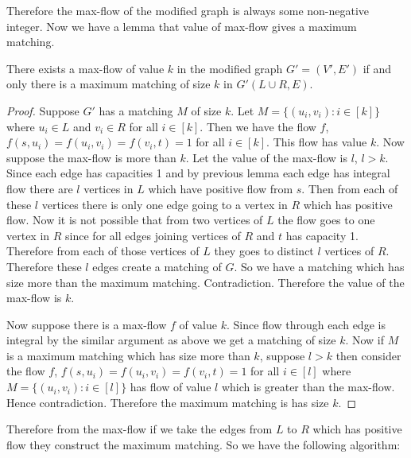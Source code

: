 Therefore the max-flow of the modified graph is always some non-negative integer. Now we have a lemma that value of max-flow gives a maximum matching.
\begin{lemma}{}{}
	There exists a max-flow of value $k$ in the modified graph $G'=(V',E')$ if and only there is a maximum matching of size $k$ in $G'(L\cup R, E)$. 
\end{lemma}
\begin{proof}
	Suppose $G'$ has a matching $M$ of size $k$. Let $M=\{(u_i,v_i)\colon i\in[k]\}$ where $u_i\in L$ and $v_i\in R$ for all $i\in[k]$. Then we have the flow $f$, $f(s,u_i)=f(u_i,v_i)=f(v_i,t)=1$ for all $i\in[k]$. This flow has value $k$. Now suppose the max-flow is more than $k$. Let the value of the max-flow is $l$, $l>k$. Since each edge has capacities 1 and by previous lemma each edge has integral flow there are $l$ vertices in $L$ which have positive flow from $s$. Then from each of these $l$ vertices there is only one edge going to a vertex in $R$ which has positive flow. Now it is not possible that from two vertices of $L$ the flow goes to one vertex in $R$ since for all edges joining vertices of $R$ and $t$ has capacity 1. Therefore from each of those vertices of $L$ they goes to distinct $l$ vertices of $R$. Therefore these $l$ edges  create a matching of $G$. So we have a matching which has size more than the maximum matching. Contradiction. Therefore the value of the max-flow is $k$.
	
	Now suppose there is a max-flow $f$ of value $k$. Since flow through each edge is integral by the similar argument as above we get a matching of size $k$. Now if $M$ is a maximum matching which has size more than $k$, suppose $l>k$ then consider the flow  $f$, $f(s,u_i)=f(u_i,v_i)=f(v_i,t)=1$ for all $i\in[l]$ where  $M=\{(u_i,v_i)\colon i\in[l]\}$ has flow of value $l$ which is greater than the max-flow. Hence contradiction. Therefore the maximum matching is has size $k$.
\end{proof}


Therefore from the max-flow if we take the edges from $L$ to $R$ which has positive flow they construct the maximum matching. So we have the following algorithm: 
\begin{algorithm}\DontPrintSemicolon
	\caption{}
\end{algorithm} 

